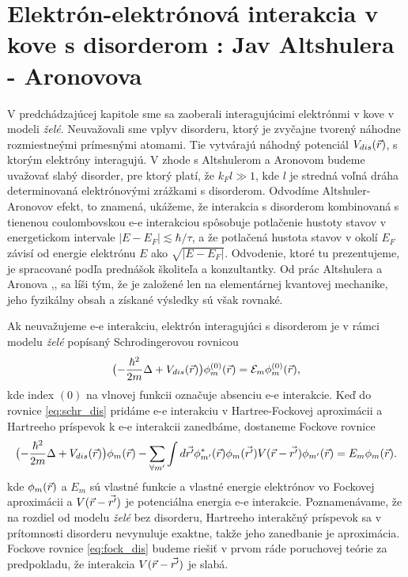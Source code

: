 
\section
{Elektrón-elektrónová interakcia v kove s disorderom : Jav Altshulera - Aronovova}

 V predchádzajúcej kapitole sme sa zaoberali interagujúcimi elektrónmi v kove v modeli {\it želé}. Neuvažovali sme vplyv disorderu, ktorý je zvyčajne tvorený náhodne rozmiestneými prímesnými atomami. Tie vytvárajú náhodný potenciál $V_{dis}(\vec{r})$, s ktorým elektróny interagujú. V zhode s Altshulerom a Aronovom budeme uvažovať slabý disorder, pre ktorý
 platí, že $k_F l \gg 1$, kde $l$ je stredná voľná dráha determinovaná elektrónovými zrážkami s disorderom. Odvodíme Altshuler-Aronovov efekt, to znamená, ukážeme, že interakcia s disorderom kombinovaná s tienenou coulombovskou e-e interakciou
 spôsobuje potlačenie hustoty stavov v energetickom intervale $|E-E_F| \lesssim \hbar/\tau$, a že potlačená hustota stavov v okolí $E_F$ závisí od energie elektrónu $E$ ako $\sqrt{|E-E_F|}$.
 Odvodenie, ktoré tu prezentujeme, je spracované podľa prednášok školiteľa a konzultantky. Od prác Altshulera a Aronova \cite{Altshuler1},\cite{Altshuler3},\cite{Altshuler4}
 sa líši tým, že je založené len na elementárnej kvantovej mechanike, jeho fyzikálny obsah a získané výsledky sú však rovnaké.



Ak neuvažujeme e-e interakciu, elektrón interagujúci s disorderom je v rámci modelu {\it želé} popísaný Schrodingerovou rovnicou
\begin{equation}
\label{eq:schr_dis}
\bigl(-\frac{\hbar^2}{2m}\Delta + V_{dis}(\vec{r})\bigr)\phi_m^{(0)}(\vec{r})=\mathcal{E}_m\phi_m^{(0)}(\vec{r}) \text{,}
\end{equation}
kde index $(0)$ na vlnovej funkcii označuje absenciu e-e interakcie.
Keď do rovnice \eqref{eq:schr_dis} pridáme e-e interakciu v Hartree-Fockovej aproximácii a Hartreeho príspevok k e-e interakcii zanedbáme, dostaneme Fockove rovnice
\begin{equation}
 \label{eq:fock_dis}
 \bigl(-\frac{\hbar^2}{2m}\Delta + V_{dis}(\vec{r}) \bigr)\phi_m(\vec{r})-\sum_{\forall m'} \int d\vec{r'} \phi^*_{m'}(\vec{r})\phi_{m}(\vec{r'})V(\vec{r}-\vec{r'})\phi_{m'}(\vec{r})=E_m\phi_m(\vec{r}) \text{.}
\end{equation}
 kde $\phi_m(\vec{r})$ a $E_m$ sú vlastné funkcie a vlastné energie elektrónov vo Fockovej aproximácii a $V(\vec{r}-\vec{r'})$ je potenciálna energia e-e interakcie. Poznamenávame, že na rozdiel od modelu {\it želé} bez disorderu, Hartreeho interakčný príspevok sa v prítomnosti disorderu
nevynuluje exaktne, takže jeho zanedbanie je aproximácia.
Fockove rovnice \eqref{eq:fock_dis} budeme riešiť v prvom ráde poruchovej teórie za predpokladu, že
interakcia $V(\vec{r}-\vec{r'})$ je slabá.

